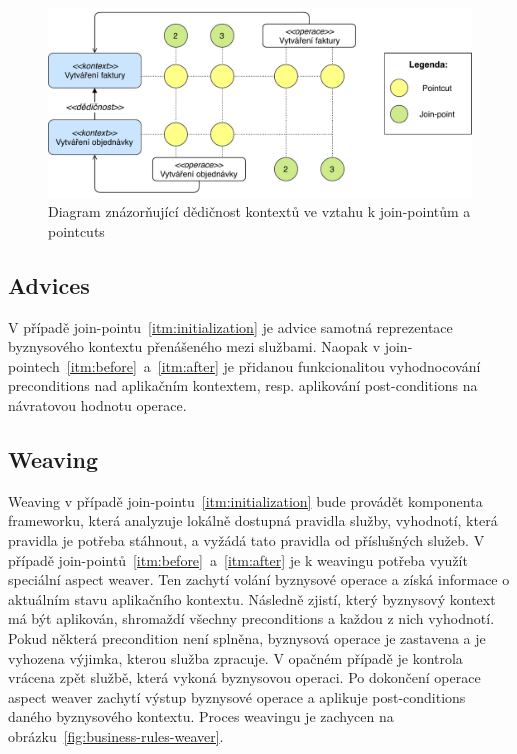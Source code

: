 \begin{figure}
    \centering
    \includegraphics[keepaspectratio=true, width=1\linewidth]{figures/context-extension.pdf}
    \caption{Diagram znázorňující dědičnost kontextů ve vztahu k join-pointům a pointcuts}
    \label{fig:context-extension}
\end{figure}

\subsection{Advices}

V případě join-pointu~\ref{itm:initialization} je advice samotná reprezentace byznysového
kontextu přenášeného mezi službami. Naopak v join-pointech~\ref{itm:before}~a~\ref{itm:after}
je přidanou funkcionalitou vyhodnocování preconditions nad aplikačním kontextem, resp. aplikování
post-conditions na návratovou hodnotu operace.

\subsection{Weaving}

Weaving v případě join-pointu~\ref{itm:initialization} bude provádět komponenta frameworku, která
analyzuje lokálně dostupná pravidla služby, vyhodnotí, která pravidla je potřeba stáhnout,
a vyžádá tato pravidla od příslušných služeb.
V případě join-pointů~\ref{itm:before}~a~\ref{itm:after} je k weavingu potřeba využít speciální aspect
weaver. Ten zachytí volání byznysové operace a získá informace o aktuálním stavu aplikačního kontextu.
Následně zjistí, který byznysový kontext má být aplikován, shromaždí všechny preconditions
a každou z nich vyhodnotí. Pokud některá precondition není splněna, byznysová operace je zastavena
a je vyhozena výjimka, kterou služba zpracuje. V opačném případě je kontrola vrácena zpět
službě, která vykoná byznysovou operaci. Po dokončení operace aspect weaver zachytí výstup byznysové
operace a aplikuje post-conditions daného byznysového kontextu. Proces weavingu je zachycen na
obrázku~\ref{fig:business-rules-weaver}.

